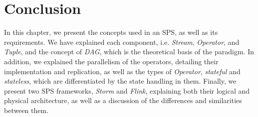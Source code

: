 \section{Conclusion}
In this chapter, we present the concepts used in an SPS, as well as its requirements. We have explained each component, i.e. \textit{Stream}, \textit{Operator}, and \textit{Tuple}, and the concept of \textit{DAG}, which is the theoretical basis of the paradigm. In addition, we explained the parallelism of the operators, detailing their implementation and replication, as well as the types of \textit{Operator}, \textit{stateful} and \textit{stateless}, which are differentiated by the state handling in them. Finally, we present two SPS frameworks, \textit{Storm} and \textit{Flink}, explaining both their logical and physical architecture, as well as a discussion of the differences and similarities between them.